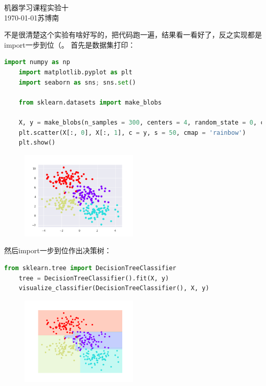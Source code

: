 \documentclass{article}
\begin{document}
\begin{center}
    \huge{机器学习课程实验十}\\
    \large{\today \quad 苏博南}
\end{center}

不是很清楚这个实验有啥好写的，把代码跑一遍，结果看一看好了，反之实现都是import一步到位（。
首先是数据集打印：
\begin{lstlisting}[language=Python]
    import numpy as np
    import matplotlib.pyplot as plt
    import seaborn as sns; sns.set()

    from sklearn.datasets import make_blobs

    X, y = make_blobs(n_samples = 300, centers = 4, random_state = 0, cluster_std = 1.0)
    plt.scatter(X[:, 0], X[:, 1], c = y, s = 50, cmap = 'rainbow')
    plt.show()
\end{lstlisting}
\begin{figure}[H]
    \centering
    \includegraphics[width=0.5\textwidth]{1.png}
\end{figure}

然后import一步到位作出决策树：
\begin{lstlisting}[language=Python]
    from sklearn.tree import DecisionTreeClassifier
    tree = DecisionTreeClassifier().fit(X, y)
    visualize_classifier(DecisionTreeClassifier(), X, y)
\end{lstlisting}

\begin{figure}[H]
    \centering
    \includegraphics[width=0.5\textwidth]{2.png}
\end{figure}
\end{document}
